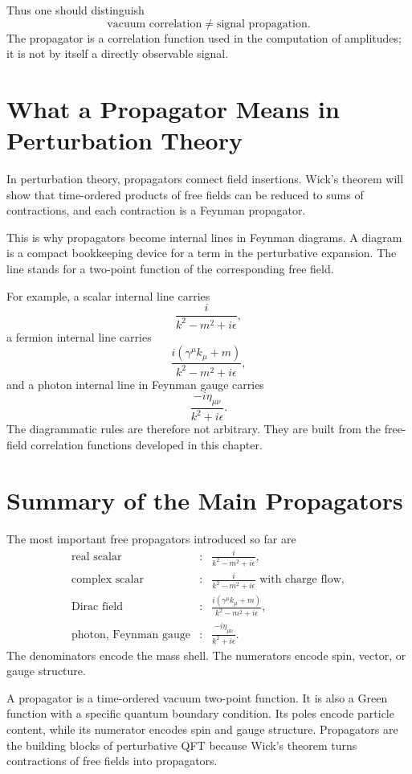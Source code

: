 Thus one should distinguish
\[
    \text{vacuum correlation}
    \neq
    \text{signal propagation}.
\]
The propagator is a correlation function used in the computation of amplitudes;
it is not by itself a directly observable signal.

\section{What a Propagator Means in Perturbation Theory}

In perturbation theory, propagators connect field insertions. Wick's theorem
will show that time-ordered products of free fields can be reduced to sums of
contractions, and each contraction is a Feynman propagator.

This is why propagators become internal lines in Feynman diagrams. A diagram is
a compact bookkeeping device for a term in the perturbative expansion. The line
stands for a two-point function of the corresponding free field.

For example, a scalar internal line carries
\[
    \frac{i}{k^2-m^2+i\epsilon},
\]
a fermion internal line carries
\[
    \frac{i(\gamma^\mu k_\mu+m)}{k^2-m^2+i\epsilon},
\]
and a photon internal line in Feynman gauge carries
\[
    \frac{-i\eta_{\mu\nu}}{k^2+i\epsilon}.
\]
The diagrammatic rules are therefore not arbitrary. They are built from the
free-field correlation functions developed in this chapter.

\section{Summary of the Main Propagators}

The most important free propagators introduced so far are
\[
\begin{array}{ccl}
\text{real scalar} &:& \displaystyle \frac{i}{k^2-m^2+i\epsilon},\\[1.0em]
\text{complex scalar} &:& \displaystyle \frac{i}{k^2-m^2+i\epsilon}
\text{ with charge flow},\\[1.0em]
\text{Dirac field} &:& \displaystyle
\frac{i(\gamma^\mu k_\mu+m)}{k^2-m^2+i\epsilon},\\[1.0em]
\text{photon, Feynman gauge} &:& \displaystyle
\frac{-i\eta_{\mu\nu}}{k^2+i\epsilon}.
\end{array}
\]
The denominators encode the mass shell. The numerators encode spin, vector, or
gauge structure.

\begin{summarybox}
A propagator is a time-ordered vacuum two-point function. It is also a Green
function with a specific quantum boundary condition. Its poles encode particle
content, while its numerator encodes spin and gauge structure. Propagators are
the building blocks of perturbative QFT because Wick's theorem turns
contractions of free fields into propagators.
\end{summarybox}

